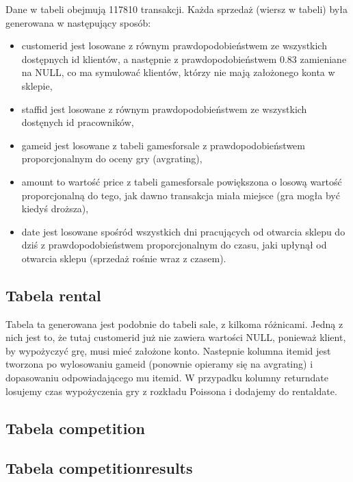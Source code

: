 \documentclass{article}
\begin{document}
		\noindent Dane w tabeli obejmują 117810 transakcji. Każda sprzedaż (wiersz w tabeli) była generowana w następujący sposób:
		\begin{itemize}
			\setlength{\itemsep}{-2pt}
			\item customer\textunderscore id jest losowane z równym prawdopodobieństwem ze wszystkich dostępnych id klientów, a następnie z prawdopodobieństwem 0.83 zamieniane na NULL, co ma symulować klientów, którzy nie mają założonego konta w sklepie,
			\item staff\textunderscore id jest losowane z równym prawdopodobieństwem ze wszystkich dostęnych id pracowników,
			\item game\textunderscore id jest losowane z tabeli games\textunderscore for\textunderscore sale z prawdopodobieństwem proporcjonalnym do oceny gry (avg\textunderscore rating),
			\item amount to wartość price z tabeli games\textunderscore for\textunderscore sale powiększona o losową wartość proporcjonalną do tego, jak dawno transakcja miała miejsce (gra mogła być kiedyś droższa),
			\item date jest losowane spośród wszystkich dni pracujących od otwarcia sklepu do dziś z prawdopodobieństwem proporcjonalnym do czasu, jaki upłynął od otwarcia sklepu (sprzedaż rośnie wraz z czasem).
		\end{itemize}

	
	\subsection{Tabela rental}
        Tabela ta generowana jest podobnie do tabeli sale, z kilkoma różnicami. Jedną z nich jest to, że tutaj customer\textunderscore id już nie zawiera wartości NULL, ponieważ klient, by wypożyczyć grę, musi mieć założone konto. Nastepnie kolumna item\textunderscore id jest tworzona po wylosowaniu game\textunderscore id (ponownie opieramy się na avg\textunderscore rating) i dopasowaniu odpowiadającego mu item\textunderscore id. W przypadku kolumny return\textunderscore date losujemy czas wypożyczenia gry z rozkładu Poissona i dodajemy do rental\textunderscore date.

	
	\subsection{Tabela competition}
	
	\subsection{Tabela competition\textunderscore results}
	
\end{document}
